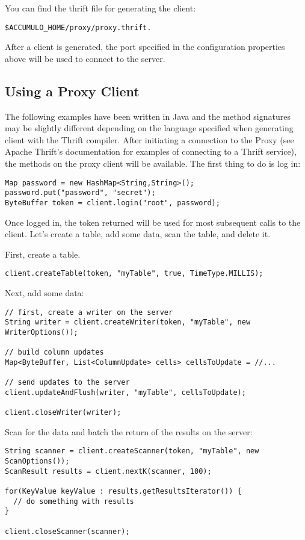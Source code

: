 You can find the thrift file for generating the client:

\small
\begin{verbatim}
$ACCUMULO_HOME/proxy/proxy.thrift.
\end{verbatim}
\normalsize

After a client is generated, the port specified in the configuration properties above will be
used to connect to the server.

\subsection{Using a Proxy Client}

The following examples have been written in Java and the method signatures may be
slightly different depending on the language specified when generating client with
the Thrift compiler. After initiating a connection to the Proxy (see Apache Thrift's
documentation for examples of connecting to a Thrift service), the methods on the
proxy client will be available. The first thing to do is log in:

\small
\begin{verbatim}
Map password = new HashMap<String,String>();
password.put("password", "secret");
ByteBuffer token = client.login("root", password);
\end{verbatim}
\normalsize

Once logged in, the token returned will be used for most subsequent calls to the client.
Let's create a table, add some data, scan the table, and delete it.


First, create a table.

\small
\begin{verbatim}
client.createTable(token, "myTable", true, TimeType.MILLIS);
\end{verbatim}
\normalsize


Next, add some data:

\small
\begin{verbatim}
// first, create a writer on the server
String writer = client.createWriter(token, "myTable", new WriterOptions());

// build column updates
Map<ByteBuffer, List<ColumnUpdate> cells> cellsToUpdate = //...

// send updates to the server
client.updateAndFlush(writer, "myTable", cellsToUpdate);

client.closeWriter(writer);
\end{verbatim}
\normalsize


Scan for the data and batch the return of the results on the server:

\small
\begin{verbatim}
String scanner = client.createScanner(token, "myTable", new ScanOptions());
ScanResult results = client.nextK(scanner, 100);

for(KeyValue keyValue : results.getResultsIterator()) {
  // do something with results
}

client.closeScanner(scanner);
\end{verbatim}
\normalsize
